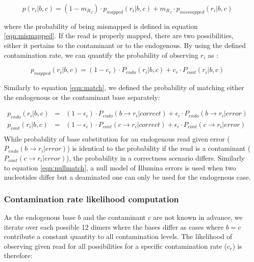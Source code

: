 \documentclass[a4paper,12pt]{article}
\begin{document}
\begin{equation}
p(r_i|b,c)  = (1-m_{R_J}) \cdot p_{mapped}(r_i|b,c) + m_{R_J} \cdot p_{mismapped}(r_i|b,c)  
\label{eqn:singlereadcont}
\end{equation}

\noindent where the probability of being mismapped is defined in equation \ref{eqn:mismapped}. If the read is properly mapped, there are two possibilities, either it pertains to the contaminant or to the endogenous. By using the defined contamination rate, we can quantify the probability of observing $r_i$ as :

\begin{equation}
p_{mapped}(r_i|b,c) = (1-c_r) \cdot P_{endo} (r_i|b,c)   + c_r \cdot P_{cont} (r_i|b,c)
\end{equation}

\noindent Similarly to equation \ref{eqn:match}, we defined the probability of matching either the endogenous or the contaminant base separately:

{\small
\begin{eqnarray}
  p_{endo}(r_i|b,c)   & = &  (1-\epsilon_i ) \cdot  P_{endo}( b \to r_i|correct) +  \epsilon_i \cdot P_{endo}(  b \to r_i |error)   \\
  p_{cont}(r_i|b,c)   & = &  (1-\epsilon_i ) \cdot  P_{cont}( c \to r_i|correct) +  \epsilon_i \cdot P_{cont}(  c \to r_i |error)   \\
\end{eqnarray} 
}
\noindent While probability of base substitution for an endogenous read given error ($P_{endo}(  b \to r_i |error)$) is identical to the probability if the read is a contaminant ($P_{cont}(  c \to r_i |error)$), the probability in a correctness scenario differs. Similarly to equation \ref{eqn:nullmatch}, a null model of Illumina errors is used when two nucleotides differ but a deaminated one can only be used for the endogenous case. 

\subsubsection{Contamination rate likelihood computation}

As the endogenous base $b$ and the contaminant $c$ are not known in advance, we iterate over each possible 12 dimers where the bases differ as cases where $b=c$ contribute a constant quantity to all contamination levels. The likelihood of observing given read for all possibilities for a specific contamination rate ($c_r$) is therefore:
\end{document}
